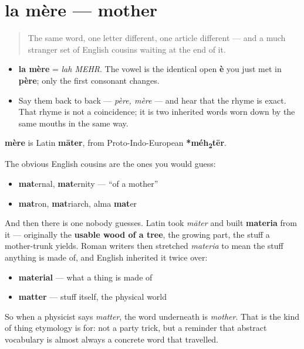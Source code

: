 \section[la mère]{la mère — mother}

\label{lesson:FR-C10-mere}



\begin{quote}
The same word, one letter different, one article different — and a much stranger set of English cousins waiting at the end of it.
\end{quote}

\begin{sounds}
\begin{itemize}
\raggedright
  \item \textbf{la mère} = \emph{lah MEHR}. The vowel is the identical open \textbf{è} you just met in \textbf{père}; only the first consonant changes.
  \item Say them back to back — \emph{père, mère} — and hear that the rhyme is exact. That rhyme is not a coincidence; it is two inherited words worn down by the same mouths in the same way.
\end{itemize}
\end{sounds}

\begin{cousinweb}
\textbf{mère} is Latin \textbf{māter}, from Proto-Indo-European \textbf{*méh\textsubscript{2}tēr}.

The obvious English cousins are the ones you would guess:

\begin{itemize}
\raggedright
  \item \textbf{mat}ernal, \textbf{mat}ernity — \textquotedblleft{}of a mother\textquotedblright{}
  \item \textbf{mat}ron, \textbf{mat}riarch, alma \textbf{mat}er
\end{itemize}

And then there is one nobody guesses. Latin took \emph{māter} and built \textbf{materia} from it — originally the \textbf{usable wood of a tree}, the growing part, the stuff a mother-trunk yields. Roman writers then stretched \emph{materia} to mean the stuff anything is made of, and English inherited it twice over:

\begin{itemize}
\raggedright
  \item \textbf{material} — what a thing is made of
  \item \textbf{matter} — stuff itself, the physical world
\end{itemize}

So when a physicist says \emph{matter}, the word underneath is \emph{mother}. That is the kind of thing etymology is for: not a party trick, but a reminder that abstract vocabulary is almost always a concrete word that travelled.
\end{cousinweb}

